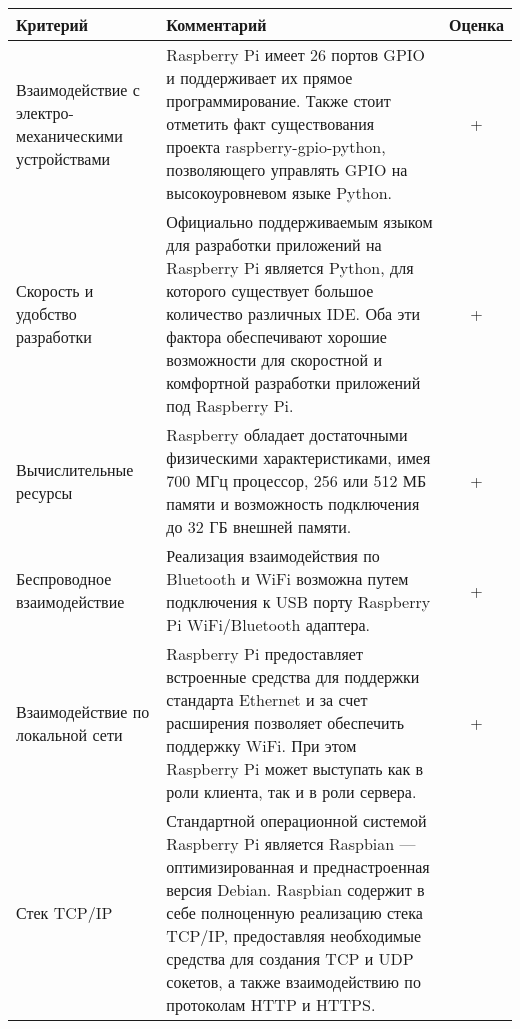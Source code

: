 \bgroup
\def\arraystretch{1.5}%

\begin{longtable}{| p{} | p{} | c |} 

\hline
Критерий & Комментарий & Оценка \\
\hline
Взаимодействие с электро-механическими  устройствами &

Raspberry Pi имеет 26 портов GPIO и поддерживает их прямое программирование\cite{RPIHardware}. Также стоит отметить факт существования проекта raspberry-gpio-python, позволяющего управлять GPIO на высокоуровневом языке Python\cite{RPiGPIOPython}. &

+\\

\hline
Скорость и удобство разработки &

Официально поддерживаемым языком для разработки приложений на Raspberry Pi является Python\cite{RPiFAQ}, для которого существует большое количество различных IDE. Оба эти фактора обеспечивают хорошие возможности для скоростной и комфортной разработки приложений под Raspberry Pi. &

+\\

\hline
Вычислительные ресурсы &

Raspberry обладает достаточными физическими характеристиками, имея 700 МГц процессор, 256 или 512 МБ памяти \cite{RPiFAQ} и возможность подключения до 32 ГБ внешней памяти. &

+\\

\hline
Беспроводное взаимодействие &

Реализация взаимодействия по Bluetooth и WiFi возможна путем подключения к USB порту Raspberry Pi WiFi/Bluetooth адаптера. &

+\\

\hline
Взаимодействие по локальной сети &

Raspberry Pi предоставляет встроенные средства для поддержки стандарта Ethernet и за счет расширения позволяет обеспечить поддержку WiFi. При этом Raspberry Pi может выступать как в роли клиента, так и в роли сервера.&

+\\

\hline
Стек TCP/IP &

Стандартной операционной системой Raspberry Pi является Raspbian\cite{Raspbian} --- оптимизированная и преднастроенная версия Debian. Raspbian содержит в себе полноценную реализацию стека TCP/IP, предоставляя необходимые средства для создания TCP и UDP сокетов, а также взаимодействию по протоколам HTTP и HTTPS. &


\end{longtable}
